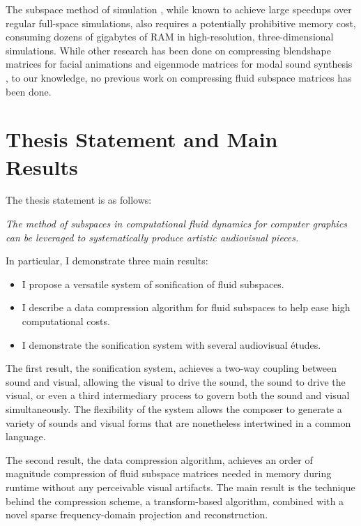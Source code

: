 The subspace method of simulation \cite{Pentland:1989:GVM}, while known to achieve large speedups over regular full-space simulations, also requires a potentially prohibitive memory cost, consuming dozens of gigabytes of RAM 
in high-resolution, three-dimensional simulations. While other research has been done on compressing blendshape matrices for facial animations \cite{Seo:2011:CDM} and eigenmode matrices for modal sound synthesis \cite{Langlois:2014:ECM},
to our knowledge, no previous work on compressing fluid subspace matrices has been done.

\section{Thesis Statement and Main Results}
The thesis statement is as follows:

\begin{addmargin}[1em]{2em}
{\em The method of subspaces in computational fluid dynamics for computer graphics can be leveraged to systematically produce artistic audiovisual pieces.}
\end{addmargin}
In particular, I demonstrate three main results:

\begin{itemize}
	\item I propose a versatile system of sonification of fluid subspaces.
	\item I describe a data compression algorithm for fluid subspaces to help ease high computational costs.
	\item I demonstrate the sonification system with several audiovisual {\'e}tudes.
\end{itemize}

The first result, the sonification system, achieves a two-way coupling between sound and visual, allowing the visual to drive the sound, the sound to drive the visual, or even a third intermediary process to govern both the sound and visual simultaneously. The flexibility of the system allows the composer to generate a variety of sounds and visual forms that are nonetheless intertwined in a common language. 

The second result, the data compression algorithm, achieves an order of magnitude compression of fluid subspace matrices needed in memory during runtime without any perceivable visual artifacts. The main result is the technique behind the compression scheme, a transform-based algorithm, combined with a novel sparse frequency-domain projection and reconstruction.

